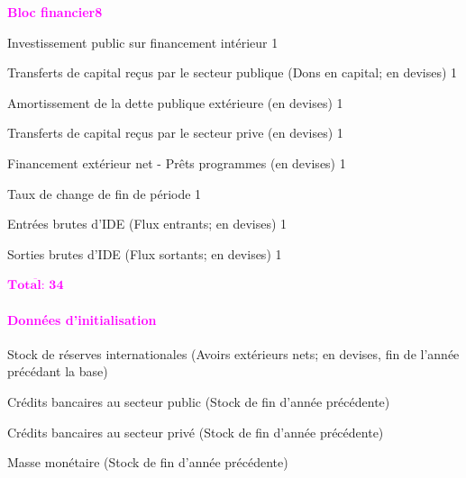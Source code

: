 \documentclass[11pt,a4paper]{article}
\newcommand{\DINVG}{\mathit{DINVG}}
\newcommand{\redparagraph}[1]{\paragraph*{\large\textcolor{Fuchsia}{#1}}}
\newcommand{\KTRG}{\mathit{KTRG}}
\newcommand{\NFDG}{\mathit{NFDG}}
\newcommand{\DCG}{\mathit{DCG}}
\newcommand{\AMORTG}{\mathit{AMORTG}}
\newcommand{\RES}{\mathit{RES}}
\newcommand{\OTHKTR}{\mathit{OTHKTR}}
\newcommand{\FDI}{\mathit{FDI}}
\newcommand{\MD}{\mathit{MD}}
\newcommand{\DCP}{\mathit{DCP}}
\newcommand{\ER}{\mathit{ER}}
\begin{document}
	\noindent\textcolor{Fuchsia}{\textbf{Bloc financier}}\hfill \textcolor{Fuchsia}{\textbf{8}}
	\begin{description}[leftmargin=!,labelwidth=\widthof{\bfseries AAAAAAAA},parsep=10pt]	
		\item[$\DINVG$]           Investissement public sur financement intérieur	\hfill 1
		\item[$\KTRG$]            Transferts de capital reçus par le secteur publique (Dons en capital; en devises)	\hfill 1
		\item[$\AMORTG$]          Amortissement de la dette publique extérieure (en devises)	\hfill 1
		\item[$\OTHKTR$]          Transferts de capital reçus par le secteur prive (en devises)	\hfill 1
		\item[$\Delta\NFDG^{\mathit{prg}}$]      Financement extérieur net - Prêts programmes (en devises)	\hfill 1
		\item[$\ER$]              Taux de change de fin de période	\hfill 1
		\item[$\FDI^{\mathit{IN}}$]          Entrées brutes d'IDE (Flux entrants; en devises)	\hfill 1
		\item[$\FDI^{\mathit{OUT}}$]         Sorties brutes d'IDE (Flux sortants; en devises)	\hfill 1
		
		\hfill \textcolor{Fuchsia}{$\overline{\textbf{Total: 34}}$}
	\end{description}
	
	
	\redparagraph{Données d'initialisation}
	\begin{description}[leftmargin=!,labelwidth=\widthof{\bfseries AAAAAAAA},parsep=10pt]    
		\item[$\RES_0$] Stock de réserves internationales (Avoirs extérieurs nets; en devises, fin de l'année précédant la base)
		\item[$\DCG_0$] Crédits bancaires au secteur public (Stock de fin d'année précédente)    
		\item[$\DCP_0$] Crédits bancaires au secteur privé (Stock de fin d'année précédente)    
		\item[$\MD_0$]  Masse monétaire (Stock de fin d'année précédente)
	\end{description}
	
	
\end{document}
